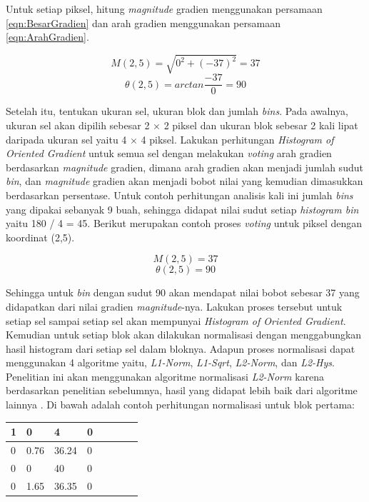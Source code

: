 Untuk setiap piksel, hitung \textit{magnitude} gradien menggunakan persamaan \eqref{eqn:BesarGradien} dan arah gradien menggunakan persamaan \eqref{eqn:ArahGradien}.

\begin{equation*}
M(2,5) = \sqrt{0^2 + (-37)^2} = 37
\end{equation*}
\begin{equation*}
\theta(2,5) = arctan\frac{-37}{0} = 90
\end{equation*}

Setelah itu, tentukan ukuran sel, ukuran blok dan jumlah \textit{bins}. Pada awalnya, ukuran sel akan dipilih sebesar 2 $\times$ 2 piksel dan ukuran blok sebesar 2 kali lipat daripada ukuran sel yaitu 4 $\times$ 4 piksel. Lakukan perhitungan \textit{Histogram of Oriented Gradient} untuk semua sel dengan melakukan \textit{voting} arah gradien berdasarkan  \textit{magnitude} gradien, dimana arah gradien akan menjadi jumlah sudut \textit{bin}, dan \textit{magnitude} gradien akan menjadi bobot nilai yang kemudian dimasukkan berdasarkan persentase. Untuk contoh perhitungan analisis kali ini jumlah \textit{bins} yang dipakai sebanyak 9 buah, sehingga didapat nilai sudut setiap \textit{histogram bin} yaitu 180 / 4 = 45. Berikut merupakan contoh proses \textit{voting} untuk piksel dengan koordinat (2,5).

\begin{equation*}
M(2,5) = 37
\end{equation*}
\begin{equation*}
\theta(2,5) = 90
\end{equation*}

Sehingga untuk \textit{bin} dengan sudut 90 akan mendapat nilai bobot sebesar 37 yang didapatkan dari nilai gradien \textit{magnitude}-nya. Lakukan proses tersebut untuk setiap sel sampai setiap sel akan mempunyai \textit{Histogram of Oriented Gradient}. Kemudian untuk setiap blok akan dilakukan normalisasi dengan menggabungkan hasil histogram dari setiap sel dalam bloknya. Adapun proses normalisasi dapat menggunakan 4 algoritme yaitu, \textit{L1-Norm}, \textit{L1-Sqrt}, \textit{L2-Norm}, dan \textit{L2-Hys}. Penelitian ini akan menggunakan algoritme normalisasi \textit{L2-Norm} karena berdasarkan penelitian sebelumnya, hasil yang didapat lebih baik dari algoritme lainnya \cite{prahara}. Di bawah adalah contoh perhitungan normalisasi untuk blok pertama:
\begin{table}[H]
	\centering
	\begin{small}
		\begin{tabular}{|p{1cm}|p{1cm}|p{1cm}|p{1cm}|p{1cm}|p{1cm}|p{1cm}|p{1cm}|}
			\hline
			1 & 0 & 4 & 0 \\
			\hline
			0 & 0.76 & 36.24 & 0 \\
			\hline
			0 & 0 & 40 & 0 \\
			\hline
			0 & 1.65 & 36.35 & 0 \\
			\hline
		\end{tabular}
	\end{small}
	\label{fig:MatriksHasilPerhitunganHistogram}
\end{table}

